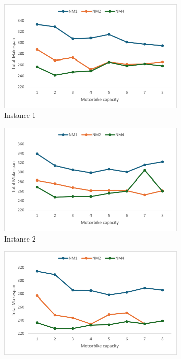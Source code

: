 \documentclass{article}
\begin{document}
	
	\begin{figure}[h]
		\centering
		\begin{subfigure}{0.33\textwidth}
			\centering
			\includegraphics[scale=0.42]{Instance1}\;
			\caption{Instance 1}
			\label{fig:p01_avg}
		\end{subfigure}
		\begin{subfigure}{0.33\textwidth}
			\centering
			\includegraphics[scale=0.42]{Instance2}\;
			\caption{Instance 2}
			\label{fig:p02_avg}
		\end{subfigure}
		\begin{subfigure}{0.33\textwidth}
			\centering
			\includegraphics[scale=0.42]{Instance3}\;

\end{subfigure}
\end{figure}
\end{document}
